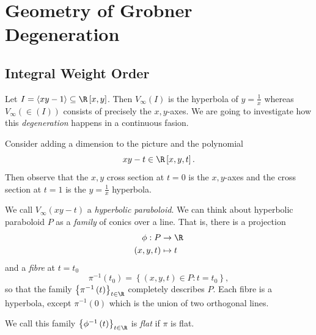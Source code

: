 \documentclass[co439]{subfiles}
\begin{document}
    \section{Geometry of Grobner Degeneration}
    
    \subsection{Integral Weight Order}

    \begin{example}{}
        Let $I = \left< xy-1 \right>\subseteq\R\left[ x,y \right]$. Then $V_{\infty}\left( I \right)$ is the hyperbola of $y=\frac{1}{x}$ whereas $V_{\infty}\left( \in\left( I \right) \right)$ consists of precisely the $x,y$-axes. We are going to investigate how this \textit{degeneration} happens in a continuous fasion.

        Consider adding a dimension to the picture and the polynomial
        \begin{equation*}
            xy-t\in\R\left[ x,y,t \right]   .
        \end{equation*}
        Then observe that the $x,y$ cross section at $t=0$ is the $x,y$-axes and the cross section at $t=1$ is the $y=\frac{1}{x}$ hyperbola.

        We call $V_{\infty}\left( xy-t \right)$ a \textit{hyperbolic paraboloid}. We can think about hyperbolic paraboloid $P$ as a \textit{family} of conics over a line. That is, there is a projection
        \begin{equation*}
            \begin{aligned}
                \phi:P&\to\R\\
                \left( x,y,t \right) & \mapsto t
            \end{aligned} 
        \end{equation*}
        and a \emph{fibre} at $t=t_0$
        \begin{equation*}
            \pi^{-1}\left( t_0 \right) = \left\lbrace \left( x,y,t \right)\in P : t=t_0 \right\rbrace,
        \end{equation*}
        so that the family $\left\lbrace \pi^{-1}\left( t \right) \right\rbrace_{t\in\R}$ completely describes $P$. Each fibre is a hyperbola, except $\pi^{-1}\left( 0 \right)$ which is the union of two orthogonal lines.

        We call this family $\left\lbrace \phi^{-1}\left( t \right) \right\rbrace^{}_{t\in\R}$ is \emph{flat} if $\pi$ is flat.
    \end{example}
\end{document}
